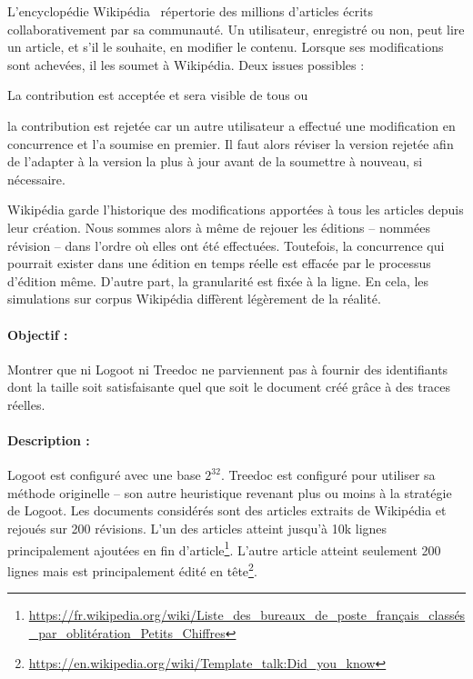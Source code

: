 L'encyclopédie Wikipédia~\cite{wikipedia} répertorie des millions d'articles
écrits collaborativement par sa communauté. Un utilisateur, enregistré ou non,
peut lire un article, et s'il le souhaite, en modifier le contenu. Lorsque ses
modifications sont achevées, il les soumet à Wikipédia. Deux issues possibles :
\begin{inparaenum}[(i)]
\item La contribution est acceptée et sera visible de tous ou
\item la contribution est rejetée car un autre utilisateur a effectué une
  modification en concurrence et l'a soumise en premier. Il faut alors réviser
  la version rejetée afin de l'adapter à la version la plus à jour avant de la
  soumettre à nouveau, si nécessaire.
\end{inparaenum}
Wikipédia garde l'historique des modifications apportées à tous les articles
depuis leur création. Nous sommes alors à même de rejouer les éditions --
nommées révision -- dans l'ordre où elles ont été effectuées. Toutefois, la
concurrence qui pourrait exister dans une édition en temps réelle est effacée
par le processus d'édition même. D'autre part, la granularité est fixée à la
ligne. En cela, les simulations sur corpus Wikipédia diffèrent légèrement de la
réalité.

\paragraph{Objectif :} Montrer que ni Logoot ni Treedoc ne parviennent pas à
fournir des identifiants dont la taille soit satisfaisante quel que soit le
document créé grâce à des traces réelles.

\paragraph{Description :} Logoot est configuré avec une base $2^{32}$. Treedoc
est configuré pour utiliser sa méthode originelle -- son autre heuristique
revenant plus ou moins à la stratégie de Logoot. Les documents considérés sont
des articles extraits de Wikipédia et rejoués sur 200 révisions. L'un des
articles atteint jusqu'à 10k lignes principalement ajoutées en fin
d'article\footnote{\scriptsize\url{https://fr.wikipedia.org/wiki/Liste_des_bureaux_de_poste_français_classés_par_oblitération_Petits_Chiffres}}. L'autre
article atteint seulement 200 lignes mais est principalement édité en
tête\footnote{\scriptsize\url{https://en.wikipedia.org/wiki/Template_talk:Did_you_know}}.

